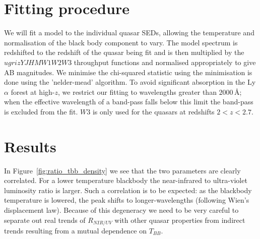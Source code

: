 \section{Fitting procedure}

We will fit a model to the individual quasar SEDs, allowing the temperature and normalisation of the black body component to vary. 
The model spectrum is redshifted to the redshift of the quasar being fit and is then multiplied by the $ugrizYJHMW1W2W3$ throughput functions and normalised appropriately to give AB magnitudes. 
We minimise the chi-squared statistic using the minimisation is done using the 'nelder-mead' algorithm.
To avoid significant absorption in the Ly$\alpha$ forest at high-$z$, we restrict our fitting to wavelengths greater than $2000$\,\AA; when the effective wavelength of a band-pass falls below this limit the band-pass is excluded from the fit. 
$W3$ is only used for the quasars at redshifts $2 < z < 2.7$. 

\section{Results}


In Figure~\ref{fig:ratio_tbb_density} we see that the two parameters are clearly correlated. 
For a lower temperature blackbody the near-infrared to ultra-violet luminosity ratio is larger. 
Such a correlation is to be expected: as the blackbody temperature is lowered, the peak shifts to longer-wavelengths (following Wien's displacement law). 
Because of this degeneracy we need to be very careful to separate out real trends of $R_{NIR/UV}$ with other quasar properties from indirect trends resulting from a mutual dependence on $T_{BB}$.  

